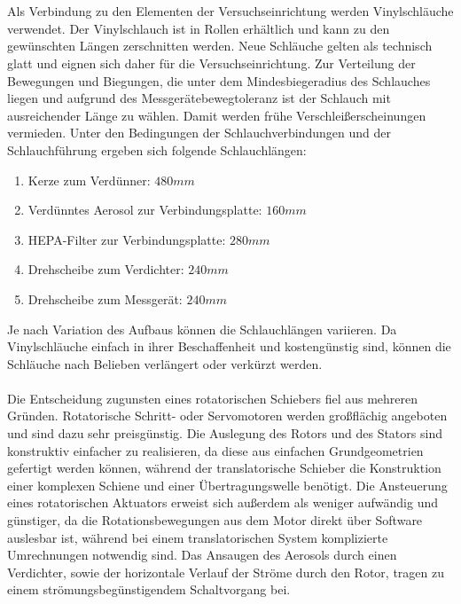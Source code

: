 \\\\
Als Verbindung zu den Elementen der Versuchseinrichtung werden Vinylschl\"{a}uche verwendet. Der Vinylschlauch ist in Rollen erh\"{a}ltlich und kann zu den gew\"{u}nschten L\"{a}ngen zerschnitten werden. Neue Schl\"{a}uche gelten als technisch glatt\citep{grote} und eignen sich daher f\"{u}r die Versuchseinrichtung. Zur Verteilung der Bewegungen und Biegungen, die unter dem Mindesbiegeradius des Schlauches liegen und aufgrund des Messger\"{a}tebewegtoleranz ist der Schlauch mit ausreichender L\"{a}nge zu w\"{a}hlen. Damit werden fr\"{u}he Verschlei{\ss}erscheinungen vermieden. Unter den Bedingungen der Schlauchverbindungen und der Schlauchf\"{u}hrung ergeben sich folgende Schlauchl\"{a}ngen:
\begin{enumerate}
	\item Kerze zum Verd\"{u}nner: \(480mm\)
	\item Verd\"{u}nntes Aerosol zur Verbindungsplatte: \(160mm\)
	\item HEPA-Filter zur Verbindungsplatte: \(280mm\)
	\item Drehscheibe zum Verdichter: \(240mm\)
	\item Drehscheibe zum Messger\"{a}t: \(240mm\)
\end{enumerate}
Je nach Variation des Aufbaus k\"{o}nnen die Schlauchl\"{a}ngen variieren. Da Vinylschl\"{a}uche einfach in ihrer Beschaffenheit und kosteng\"{u}nstig sind, k\"{o}nnen die Schl\"{a}uche nach Belieben verl\"{a}ngert oder verk\"{u}rzt werden.
\\\\
Die Entscheidung zugunsten eines rotatorischen Schiebers fiel aus mehreren Gr\"{u}nden. Rotatorische Schritt- oder Servomotoren werden gro{\ss}fl\"{a}chig angeboten und sind dazu sehr preisg\"{u}nstig. Die Auslegung des Rotors und des Stators sind konstruktiv einfacher zu realisieren, da diese aus einfachen Grundgeometrien gefertigt werden k\"{o}nnen, w\"{a}hrend der translatorische Schieber die Konstruktion einer komplexen Schiene und einer \"{U}bertragungswelle ben\"{o}tigt. Die Ansteuerung eines rotatorischen Aktuators erweist sich au{\ss}erdem als weniger aufw\"{a}ndig und g\"{u}nstiger, da die Rotationsbewegungen aus dem Motor direkt \"{u}ber Software auslesbar ist, w\"{a}hrend bei einem translatorischen System komplizierte Umrechnungen notwendig sind. Das Ansaugen des Aerosols durch einen Verdichter, sowie der horizontale Verlauf der Str\"{o}me durch den Rotor, tragen zu einem str\"{o}mungsbeg\"{u}nstigendem Schaltvorgang bei.
